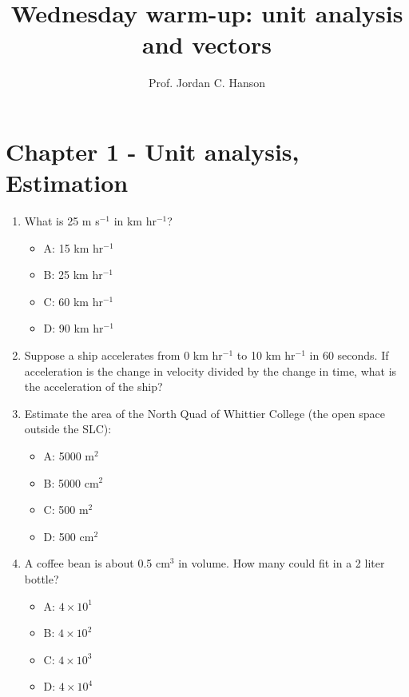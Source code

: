 \documentclass{article}
\begin{document}
\twocolumn

\title{Wednesday warm-up: unit analysis and vectors}
\author{Prof. Jordan C. Hanson}

\maketitle

\section{Chapter 1 - Unit analysis, \\ Estimation}

\begin{enumerate}
\item What is 25 m s$^{-1}$ in km hr$^{-1}$?
\begin{itemize}
\item A: 15 km hr$^{-1}$
\item B: 25 km hr$^{-1}$
\item C: 60 km hr$^{-1}$
\item D: 90 km hr$^{-1}$
\end{itemize}
\item Suppose a ship accelerates from 0 km hr$^{-1}$ to 10 km hr$^{-1}$ in 60 seconds.  If acceleration is the change in velocity divided by the change in time, what is the acceleration of the ship? \\ \vspace{1cm}
\item Estimate the area of the North Quad of Whittier College (the open space outside the SLC):
\begin{itemize}
\item A: 5000 m$^2$
\item B: 5000 cm$^2$
\item C: 500 m$^2$
\item D: 500 cm$^2$
\end{itemize}
\item A coffee bean is about 0.5 cm$^3$ in volume.  How many could fit in a 2 liter bottle?
\begin{itemize}
\item A: $4\times 10^{1}$
\item B: $4\times 10^{2}$
\item C: $4\times 10^{3}$
\item D: $4\times 10^{4}$
\end{itemize}
\end{enumerate}
\end{document}
